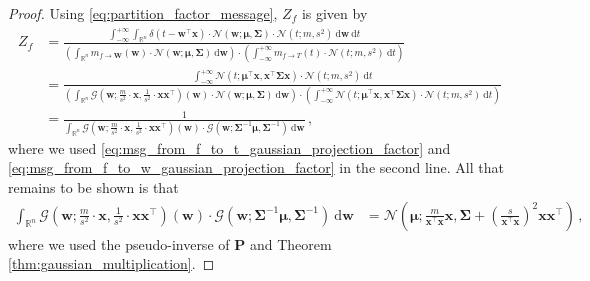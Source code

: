 \documentclass[a4paper]{article}
\newcommand{\Real}{{\mathbb R}}
\newcommand{\Normal}[3]{{\mathcal N} \left({#1};{#2},{#3}\right)}
\newcommand{\Gauss}[3]{{\mathcal G} \left({#1};{#2},{#3}\right)}
\newcommand{\bs}[1]{{\boldsymbol{#1}}}
\newcommand{\dirac}[1]{{\delta \left( {#1} \right)}}
\newcommand{\intd}[1]{\ \mathrm{d}{#1}}
\newcommand{\transpose}[1]{{#1}^\top}
\theoremstyle{definition}
\begin{document}
\begin{proof}
    Using \eqref{eq:partition_factor_message}, $Z_{f}$ is given by
    \begin{align*}
        Z_{f} & = \frac{\int_{-\infty}^{+\infty} \int_{\Real^n} \dirac{t - \transpose{\bs{w}}\bs{x}} \cdot \Normal{\bs{w}}{\bs{\mu}}{\bs{\Sigma}} \cdot \Normal{t}{m}{s^2} \intd{\bs{w}}\intd{t}}{\left( \int_{\Real^n} m_{f\rightarrow \bs{W}} (\bs{w}) \cdot \Normal{\bs{w}}{\bs{\mu}}{\bs{\Sigma}} \intd{\bs{w}} \right) \cdot \left( \int_{-\infty}^{+\infty} m_{f\rightarrow T} (t) \cdot \Normal{t}{m}{s^2} \intd{t} \right)} \\
        & = \frac{\int_{-\infty}^{+\infty} \Normal{t}{\transpose{\bs{\mu}}\bs{x}}{\transpose{\bs{x}}\bs{\Sigma}\bs{x}} \cdot \Normal{t}{m}{s^2} \intd{t}}{\left( \int_{\Real^n} \Gauss{\bs{w}}{\frac{m}{s^2} \cdot \bs{x}}{\frac{1}{s^2} \cdot \bs{x}\transpose{\bs{x}}} (\bs{w}) \cdot \Normal{\bs{w}}{\bs{\mu}}{\bs{\Sigma}} \intd{\bs{w}} \right) \cdot \left( \int_{-\infty}^{+\infty} \Normal{t}{\transpose{\bs{\mu}}\bs{x}}{\transpose{\bs{x}}\bs{\Sigma}\bs{x}} \cdot \Normal{t}{m}{s^2} \intd{t} \right)} \\ 
        & = \frac{1}{\int_{\Real^n} \Gauss{\bs{w}}{\frac{m}{s^2} \cdot \bs{x}}{\frac{1}{s^2} \cdot \bs{x}\transpose{\bs{x}}} (\bs{w}) \cdot \Gauss{\bs{w}}{\bs{\Sigma}^{-1} \bs{\mu}}{\bs{\Sigma}^{-1}} \intd{\bs{w}}} \,,
    \end{align*}
    where we used \eqref{eq:msg_from_f_to_t_gaussian_projection_factor} and \eqref{eq:msg_from_f_to_w_gaussian_projection_factor} in the second line. All that remains to be shown is that 
    \begin{align*}
        \int_{\Real^n} \Gauss{\bs{w}}{\frac{m}{s^2} \cdot \bs{x}}{\frac{1}{s^2} \cdot \bs{x}\transpose{\bs{x}}} (\bs{w}) \cdot \Gauss{\bs{w}}{\bs{\Sigma}^{-1} \bs{\mu}}{\bs{\Sigma}^{-1}} \intd{\bs{w}} & = \Normal{\bs{\mu}}{\frac{m}{\transpose{\bs{x}}\bs{x}} \bs{x}}{\bs{\Sigma} + \left(\frac{s}{\transpose{\bs{x}}\bs{x}}\right)^2 \bs{x}\transpose{\bs{x}}} \,,
    \end{align*}
    where we used the pseudo-inverse of $\bs{P}$ and Theorem \ref{thm:gaussian_multiplication}.
\end{proof}
\end{document}
